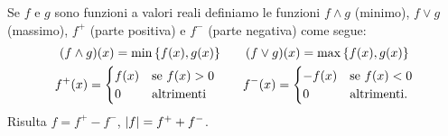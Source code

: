 Se $f$ e $g$ sono funzioni a valori reali definiamo le
funzioni $f\wedge g$ (minimo), $f \vee g$ (massimo),
$f^+$ (parte positiva) e $f^-$ (parte negativa) come segue:
\begin{gather*}
  (f \wedge g)(x) = \min{\left\{ f(x), g(x) \right\}}  \qquad
  (f \vee g)(x) = \max{\left\{ f(x), g(x) \right\}} \\
  f^+ (x) =
      \begin{cases}
      f(x) & \text{se $f(x)> 0$}\\
      0 & \text{altrimenti}
      \end{cases} \qquad
  f^- (x) =
      \begin{cases}
      -f(x) & \text{se $f(x)< 0$}\\
      0 & \text{altrimenti.}
      \end{cases}
\end{gather*}
Risulta $f= f^+ - f^-$, ${\left|f\right|}=f^+ + f^-$.

